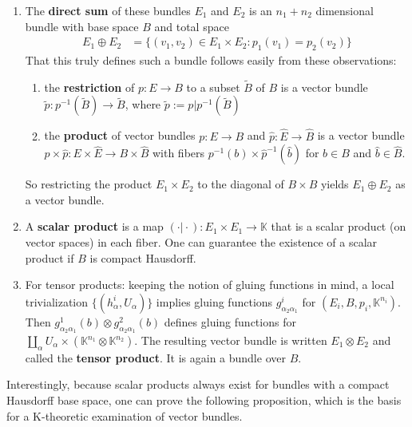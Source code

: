 \begin{enumerate}
\item[$\bullet$]
  The \textbf{direct sum} of these bundles $E_{1}$ and $E_{2}$ is an $n_{1} + n_{2}$ dimensional bundle with base space $B$ and total space
\begin{align*}
  E_{1} \oplus E_{2}
  &=
  \lbrace
      (v_{1},v_{2})
      \in
      E_{1}
      \times
      E_{2}
    \colon
      p_{1}(v_{1})
      =
      p_{2}(v_{2})
  \rbrace
\end{align*}
That this truly defines such a bundle follows easily from these observations:
\begin{enumerate}
\item[(i)]
the \textbf{restriction} of $p \colon E \to B$ to a subset $\tilde{B}$ of $B$ is a vector bundle $\tilde{p} \colon p^{-1}(\tilde{B}) \to \tilde{B}$, where $\tilde{p} := p \vert p^{-1}(\tilde{B})$
\item[(ii)]
the \textbf{product} of vector bundles $p \colon E \to B$ and $\hat{p} \colon \hat{E} \to \hat{B}$ is a vector bundle $p \times \hat{p} \colon E \times \hat{E} \to B \times \hat{B}$ with fibers $p^{-1}(b) \times \hat{p}^{-1}(\hat{b})$ for $b \in B$ and $\hat{b} \in \hat{B}$.
\end{enumerate}
So restricting the product $E_{1} \times E_{2}$ to the diagonal of $B \times B$ yields $E_{1} \oplus E_{2}$ as a vector bundle.
\item[$\bullet$]
A \textbf{scalar product} is a map $(\cdot\vert\cdot) \colon E_{1} \times E_{1} \to \mathbb{K}$ that is a scalar product (on vector spaces) in each fiber.
One can guarantee the existence of a scalar product if $B$ is compact Hausdorff.
\item[$\bullet$]
For tensor products: keeping the notion of gluing functions in mind, a local trivialization $\lbrace (h_{\alpha}^{i},U_{\alpha}) \rbrace$ implies gluing functions $g_{\alpha_{2}\alpha_{1}}^{i}$ for $(E_{i},B,p_{i},\mathbb{K}^{n_{i}})$.
Then $g_{\alpha_{2}\alpha_{1}}^{1}(b) \otimes g_{\alpha_{2}\alpha_{1}}^{2}(b)$ defines gluing functions for $\coprod_{\alpha}U_{\alpha} \times (\mathbb{K}^{n_{1}} \otimes \mathbb{K}^{n_{2}})$.
The resulting vector bundle is written $E_{1} \otimes E_{2}$ and called the \textbf{tensor product}.
It is again a bundle over $B$.
\end{enumerate}
Interestingly, because scalar products always exist for bundles with a compact Hausdorff base space, one can prove the following proposition, which is the basis for a K-theoretic examination of vector bundles.

